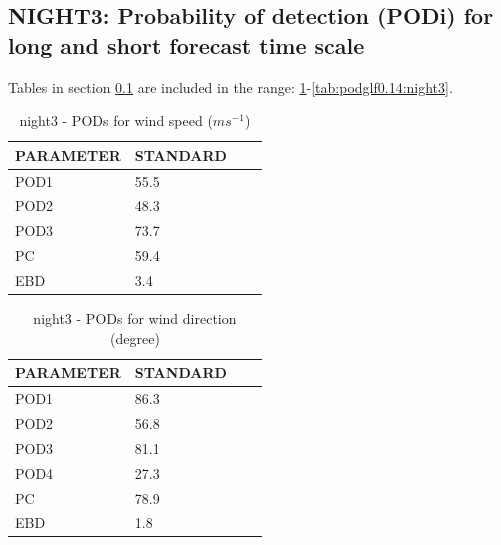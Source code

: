 \subsection{NIGHT3: Probability of detection (PODi) for long and short forecast time scale}\label{subsec:night3:pod}
Tables in section \ref{subsec:night3:pod} are included in the range: \ref{tab:podws:night3}-\ref{tab:podglf0.14:night3}.
\begin{table}[h!]
\begin{center}
\begin{tabular}{|l|l|l|l|}
\hline
\multicolumn{1}{|c|}{\cellcolor[HTML]{C0C0C0}\textbf{PARAMETER}} & \multicolumn{1}{c|}{\cellcolor[HTML]{C0C0C0}\textbf{STANDARD}} \\
\hline
\cellcolor[HTML]{C0C0C0}POD1  & 55.5                                \\
\cellcolor[HTML]{C0C0C0}POD2  & 48.3                                \\
\cellcolor[HTML]{C0C0C0}POD3  & 73.7                                \\
\cellcolor[HTML]{C0C0C0}PC    & 59.4                                  \\
\cellcolor[HTML]{C0C0C0}EBD   & 3.4                                 \\
\hline
\end{tabular}
\caption{night3 - PODs for wind speed ($m s^{-1}$)}
\label{tab:podws:night3}
\end{center}
\end{table}
\begin{table}[p!]
\begin{center}
\begin{tabular}{|l|l|l|l|}
\hline
\multicolumn{1}{|c|}{\cellcolor[HTML]{C0C0C0}\textbf{PARAMETER}} & \multicolumn{1}{c|}{\cellcolor[HTML]{C0C0C0}\textbf{STANDARD}}\\
\hline
\cellcolor[HTML]{C0C0C0}POD1  & 86.3      \\
\cellcolor[HTML]{C0C0C0}POD2  & 56.8      \\
\cellcolor[HTML]{C0C0C0}POD3  & 81.1      \\
\cellcolor[HTML]{C0C0C0}POD4  & 27.3      \\
\cellcolor[HTML]{C0C0C0}PC    & 78.9        \\
\cellcolor[HTML]{C0C0C0}EBD   & 1.8       \\
\hline
\end{tabular}
\caption{night3 - PODs for wind direction (degree)}
\label{tab:podwd:night3}
\end{center}
\end{table}
